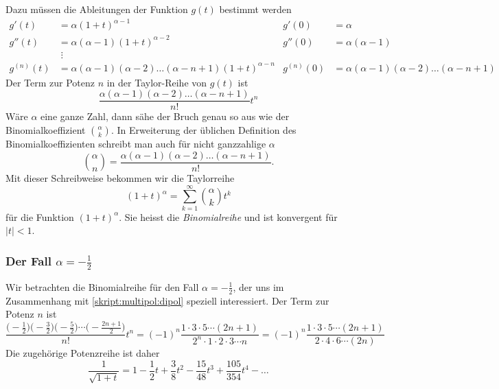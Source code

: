 Dazu müssen die Ableitungen der Funktion $g(t)$ bestimmt werden
\begin{align*}
g'(t)
&=
\alpha(1+t)^{\alpha-1}
&
g'(0)&=\alpha
\\
g''(t)
&=
\alpha(\alpha-1)(1+t)^{\alpha-2}
&
g''(0)&=\alpha(\alpha-1)
\\
&\;\vdots
\\
g^{(n)}(t)
&=
\alpha(\alpha-1)(\alpha-2)\dots(\alpha-n+1) (1+t)^{\alpha -n}
&
g^{(n)}(0)&=\alpha(\alpha-1)(\alpha-2)\dots(\alpha -n +1)
\end{align*}
Der Term zur Potenz $n$ in der Taylor-Reihe von $g(t)$ ist
\[
\frac{\alpha(\alpha-1)(\alpha-2)\dots(\alpha-n+1)}{n!} t^n
\]
Wäre $\alpha$ eine ganze Zahl, dann sähe der Bruch
genau so aus wie der Binomialkoeffizient $\binom{\alpha}{k}$.
In Erweiterung der üblichen Definition des Binomialkoeffizienten
schreibt man auch für nicht ganzzahlige $\alpha$
\[
\binom{\alpha}{n}
=
\frac{\alpha(\alpha-1)(\alpha-2)\dots(\alpha-n+1)}{n!}.
\]
Mit dieser Schreibweise bekommen wir die Taylorreihe
\[
(1+t)^\alpha=\sum_{k=1}^\infty \binom{\alpha}{k} t^k
\]
für die Funktion $(1+t)^\alpha$.
Sie heisst die {\em Binomialreihe} und ist konvergent für $|t|<1$.

\subsubsection{Der Fall $\alpha=-\frac12$}
Wir betrachten die Binomialreihe für den Fall $\alpha=-\frac12$, der
uns im Zusammenhang mit \eqref{skript:multipol:dipol} speziell
interessiert.
Der Term zur Potenz $n$ ist
\begin{equation}
\frac{
\bigl(-\frac12\bigr)
\bigl(-\frac32\bigr)
\bigl(-\frac52\bigr)
\cdots
\bigl(-\frac{2n+1}2\bigr)}{n!} t^n
=
(-1)^n \frac{1\cdot 3\cdot 5 \cdots (2n + 1)}{2^n\cdot 1\cdot 2\cdot 3\cdots n}
=
(-1)^n \frac{1\cdot 3\cdot 5 \cdots (2n+1)}{2\cdot 4\cdot 6\cdots (2n)}
\label{skript:multipol:koeffizienten}
\end{equation}
Die zugehörige Potenzreihe ist daher
\[
\frac1{\sqrt{1+t}}
=
1-\frac12t+\frac3{8}t^2-\frac{15}{48}t^3+\frac{105}{354}t^4-\dots
\]

